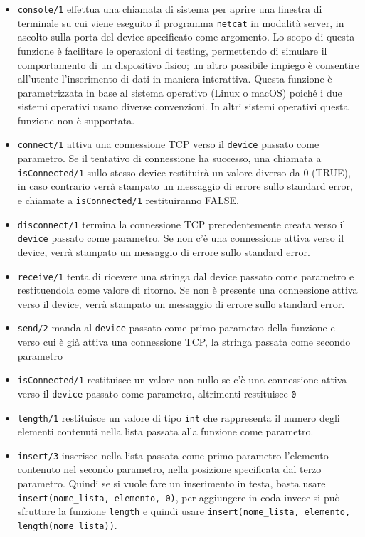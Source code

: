 \documentclass[10pt]{article}
\begin{document}
\begin{itemize}
\item \texttt{console/1} effettua una chiamata di sistema per aprire una finestra di terminale su cui viene eseguito il programma \texttt{netcat} in modalità server, in ascolto sulla porta del device specificato come argomento. Lo scopo di questa funzione è facilitare le operazioni di testing, permettendo di simulare il comportamento di un dispositivo fisico; un altro possibile impiego è consentire all'utente l'inserimento di dati in maniera interattiva. Questa funzione è parametrizzata in base al sistema operativo (Linux o macOS) poiché i due sistemi operativi usano diverse convenzioni. In altri sistemi operativi questa funzione non è supportata.
\item \texttt{connect/1} attiva una connessione TCP verso il \texttt{device} passato come parametro. Se il tentativo di connessione ha successo, una chiamata a \texttt{isConnected/1} sullo stesso device restituirà un valore diverso da 0 (TRUE), in caso contrario verrà stampato un messaggio di errore sullo standard error, e chiamate a \texttt{isConnected/1} restituiranno FALSE.
\item \texttt{disconnect/1} termina la connessione TCP precedentemente creata verso il \texttt{device} passato come parametro. Se non c'è una connessione attiva verso il device, verrà stampato un messaggio di errore sullo standard error.
\item \texttt{receive/1} tenta di ricevere una stringa dal device passato come parametro e restituendola come valore di ritorno. Se non è presente una connessione attiva verso il device, verrà stampato un messaggio di errore sullo standard error. 
\item \texttt{send/2} manda al \texttt{device} passato come primo parametro della funzione e verso cui è già attiva una connessione TCP, la stringa passata come secondo parametro
\item \texttt{isConnected/1} restituisce un valore non nullo se c'è una connessione attiva verso il \texttt{device} passato come parametro, altrimenti restituisce \texttt{0}
\item \texttt{length/1} restituisce un valore di tipo \texttt{int} che rappresenta il numero degli elementi contenuti nella lista passata alla funzione come parametro.
\item \texttt{insert/3} inserisce nella lista passata come primo parametro l'elemento contenuto nel secondo parametro, nella posizione specificata dal terzo parametro. Quindi se si vuole fare un inserimento in testa, basta usare \texttt{insert(nome\_lista, elemento, 0)}, per aggiungere in coda invece si può sfruttare la funzione \texttt{length} e quindi usare \texttt{insert(nome\_lista, elemento, length(nome\_lista))}. 

\end{itemize}
\end{document}

